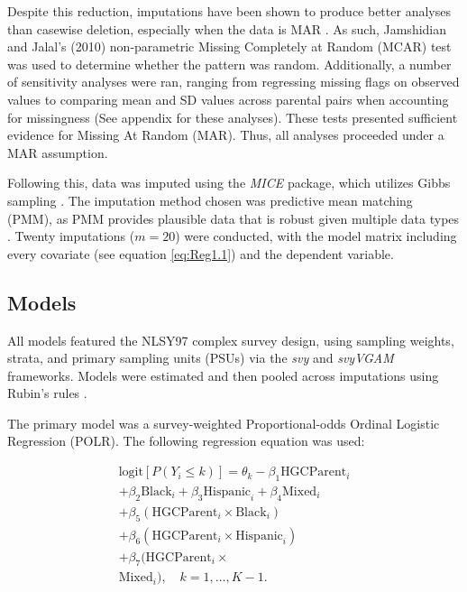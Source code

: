 \documentclass[jou,12pt,floatsintext]{apa7}
\begin{document}
Despite this reduction, imputations have been shown to produce better analyses than casewise deletion, especially when the data is MAR \parencite{afghari_contrasting_2019}. As such, Jamshidian and Jalal's (2010)\nocite{jamshidian_tests_2010} non-parametric Missing Completely at Random (MCAR) test was used to determine whether the pattern was random. Additionally, a number of sensitivity analyses were ran, ranging from regressing missing flags on observed values to comparing mean and SD values across parental pairs when accounting for missingness (See appendix for these analyses). These tests presented sufficient evidence for Missing At Random (MAR). Thus, all analyses proceeded under a MAR assumption.

Following this, data was imputed using the \textit{MICE} package, which utilizes Gibbs sampling \parencite{buuren_flexible_2021}. The imputation method chosen was predictive mean matching (PMM), as PMM provides plausible data that is robust given multiple data types \parencite{buuren_flexible_2021}. Twenty imputations ($\textit{m} = 20$) were conducted, with the model matrix including every covariate (see equation \ref{eq:Reg1.1}) and the dependent variable.

\subsection{Models}

All models featured the NLSY97 complex survey design, using sampling weights, strata, and primary sampling units (PSUs) via the \textit{svy} and \textit{svyVGAM} frameworks. Models were estimated and then pooled across imputations using Rubin's rules \parencite[Section 5.2]{buuren_flexible_2021}.

The primary model was a survey-weighted Proportional-odds Ordinal Logistic Regression (POLR). The following regression equation was used:

\begin{multline}
  \label{eq:Reg1.1}
  \text{logit}\left[P(Y_i \le k)\right] = \theta_k -
  \beta_1 \text{HGCParent}_i\\
  + \beta_2 \text{Black}_i
  + \beta_3 \text{Hispanic}_i
  + \beta_4 \text{Mixed}_i\\
  + \beta_5 (\text{HGCParent}_i \times \text{Black}_i)\\
  + \beta_6 (\text{HGCParent}_i \times \text{Hispanic}_i)\\
  + \beta_7 (\text{HGCParent}_i \times \\
  \text{Mixed}_i), \quad k=1,\dots,K-1.
\end{multline}
\end{document}

